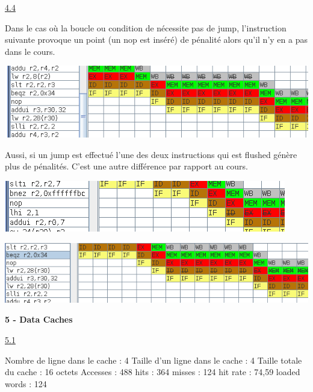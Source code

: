 \documentclass[a4paper,12pt]{article}
\begin{document}
	\underline{4.4}\\
		\par
		Dans le cas où la boucle ou condition de nécessite pas de jump, l'instruction suivante provoque un point (un nop est inséré) de pénalité alors qu'il n'y en a pas dans le cours.\\
		\begin{center}
			\includegraphics[width=\linewidth * 2 / 3]{img/8}
		\end{center}
		Aussi, si un jump est effectué l'une des deux instructions qui est flushed génère plus de pénalités. C'est une autre différence par rapport au cours.\\
		\begin{center}
			\includegraphics[width=\linewidth * 3 / 5]{img/6}
		\end{center}
		\begin{center}
			\includegraphics[width=\linewidth * 2 / 3]{img/7}
		\end{center}

	\break
	\Large{\textbf{5 - Data Caches}}\\\break
	\small

	\underline{5.1}\\
		\par
		Nombre de ligne dans le cache : 4
		Taille d'un ligne dans le cache : 4
		Taille totale du cache : 16 octets
			Accesses : 488
			hits : 364
			misses : 124
			hit rate : 74,59%
			loaded words : 124
\end{document}
